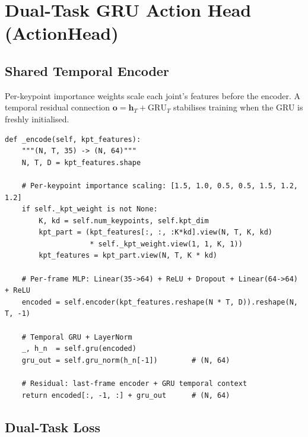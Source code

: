 \section{Dual-Task GRU Action Head (ActionHead)}

\subsection*{Shared Temporal Encoder}

Per-keypoint importance weights scale each joint's features before the
encoder. A temporal residual connection $\mathbf{o} = \mathbf{h}_T + \text{GRU}_T$
stabilises training when the GRU is freshly initialised.

\begin{lstlisting}[caption={ActionHead MLP + GRU + temporal residual},
                   label={lst:action-encode}]
def _encode(self, kpt_features):
    """(N, T, 35) -> (N, 64)"""
    N, T, D = kpt_features.shape

    # Per-keypoint importance scaling: [1.5, 1.0, 0.5, 0.5, 1.5, 1.2, 1.2]
    if self._kpt_weight is not None:
        K, kd = self.num_keypoints, self.kpt_dim
        kpt_part = (kpt_features[:, :, :K*kd].view(N, T, K, kd)
                    * self._kpt_weight.view(1, 1, K, 1))
        kpt_features = kpt_part.view(N, T, K * kd)

    # Per-frame MLP: Linear(35->64) + ReLU + Dropout + Linear(64->64) + ReLU
    encoded = self.encoder(kpt_features.reshape(N * T, D)).reshape(N, T, -1)

    # Temporal GRU + LayerNorm
    _, h_n  = self.gru(encoded)
    gru_out = self.gru_norm(h_n[-1])        # (N, 64)

    # Residual: last-frame encoder + GRU temporal context
    return encoded[:, -1, :] + gru_out      # (N, 64)
\end{lstlisting}

\subsection*{Dual-Task Loss}

